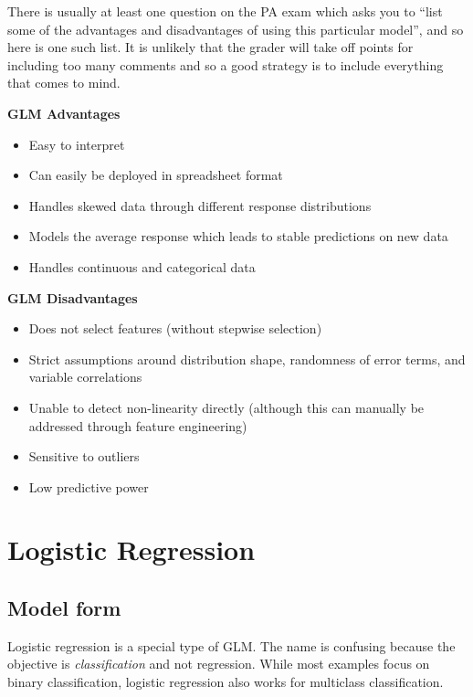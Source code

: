 \documentclass[openany]{book}
\providecommand{\tightlist}{%
  \setlength{\itemsep}{0pt}\setlength{\parskip}{0pt}}
\begin{document}
There is usually at least one question on the PA exam which asks you to ``list some of the advantages and disadvantages of using this particular model'', and so here is one such list. It is unlikely that the grader will take off points for including too many comments and so a good strategy is to include everything that comes to mind.

\textbf{GLM Advantages}

\begin{itemize}
\tightlist
\item
  Easy to interpret
\item
  Can easily be deployed in spreadsheet format
\item
  Handles skewed data through different response distributions
\item
  Models the average response which leads to stable predictions on new data
\item
  Handles continuous and categorical data
\end{itemize}

\textbf{GLM Disadvantages}

\begin{itemize}
\tightlist
\item
  Does not select features (without stepwise selection)
\item
  Strict assumptions around distribution shape, randomness of error terms, and variable correlations
\item
  Unable to detect non-linearity directly (although this can manually be addressed through feature engineering)
\item
  Sensitive to outliers
\item
  Low predictive power
\end{itemize}

\hypertarget{logistic-regression}{%
\chapter{Logistic Regression}\label{logistic-regression}}

\hypertarget{model-form}{%
\section{Model form}\label{model-form}}

Logistic regression is a special type of GLM. The name is confusing because the objective is \emph{classification} and not regression. While most examples focus on binary classification, logistic regression also works for multiclass classification.
\end{document}

